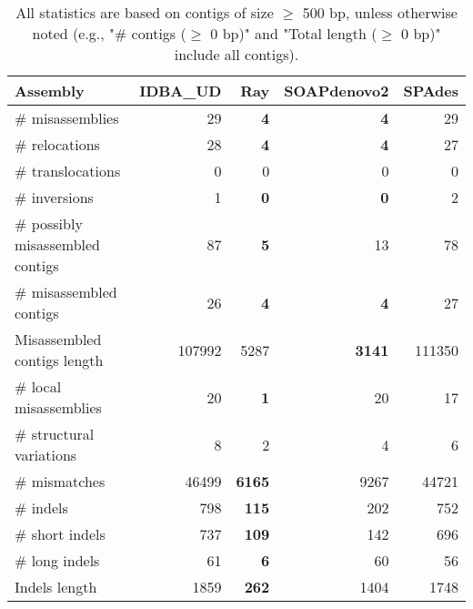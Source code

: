 \documentclass[12pt,a4paper]{article}
\begin{document}
\begin{table}[ht]
\begin{center}
\caption{All statistics are based on contigs of size $\geq$ 500 bp, unless otherwise noted (e.g., "\# contigs ($\geq$ 0 bp)" and "Total length ($\geq$ 0 bp)" include all contigs).}
\begin{tabular}{|l*{4}{|r}|}
\hline
Assembly & IDBA\_UD & Ray & SOAPdenovo2 & SPAdes \\ \hline
\# misassemblies & 29 & {\bf 4} & {\bf 4} & 29 \\ \hline
\hspace{5mm}\# relocations & 28 & {\bf 4} & {\bf 4} & 27 \\ \hline
\hspace{5mm}\# translocations & 0 & 0 & 0 & 0 \\ \hline
\hspace{5mm}\# inversions & 1 & {\bf 0} & {\bf 0} & 2 \\ \hline
\# possibly misassembled contigs & 87 & {\bf 5} & 13 & 78 \\ \hline
\# misassembled contigs & 26 & {\bf 4} & {\bf 4} & 27 \\ \hline
Misassembled contigs length & 107992 & 5287 & {\bf 3141} & 111350 \\ \hline
\# local misassemblies & 20 & {\bf 1} & 20 & 17 \\ \hline
\# structural variations & 8 & 2 & 4 & 6 \\ \hline
\# mismatches & 46499 & {\bf 6165} & 9267 & 44721 \\ \hline
\# indels & 798 & {\bf 115} & 202 & 752 \\ \hline
\hspace{5mm}\# short indels & 737 & {\bf 109} & 142 & 696 \\ \hline
\hspace{5mm}\# long indels & 61 & {\bf 6} & 60 & 56 \\ \hline
Indels length & 1859 & {\bf 262} & 1404 & 1748 \\ \hline
\end{tabular}
\end{center}
\end{table}
\end{document}
